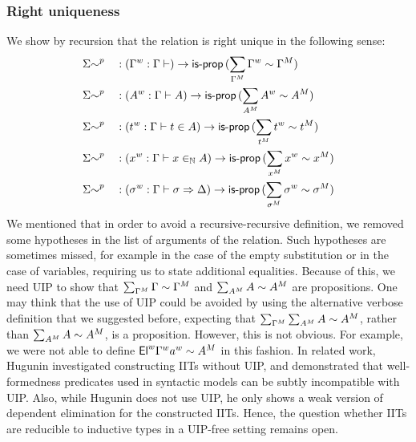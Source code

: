   \subsubsection{Right uniqueness}
  \label{sec:right_uniqueness}
  We show by recursion that the relation is right unique in the following sense:
  \begin{alignat*}{5}
    &
    {\Sigma{\sim}}^p
    && : ({\Gamma}^w : \Gamma \vdash ) \rightarrow
    \mathsf{is\text{-}prop}\, (\sum_{{\Gamma}^M} {\Gamma}^w \sim {\Gamma}^M)
    \\
    &
    {\Sigma{\sim}}^p
    && : ({A}^w : \Gamma \vdash A) \rightarrow
    \mathsf{is\text{-}prop}\, (\sum_{{A}^M} {A}^w \sim {A}^M)
    \\
    &
    {\Sigma{\sim}}^p
    && : ({t}^w : \Gamma \vdash t \in A) \rightarrow
    \mathsf{is\text{-}prop}\, (\sum_{{t}^M} {t}^w \sim {t}^M)
    \\
    &
    {\Sigma{\sim}}^p
    && : ({x}^w : \Gamma \vdash x \in_{\mathbb{N}} A) \rightarrow
    \mathsf{is\text{-}prop}\, (\sum_{{x}^M} {x}^w \sim {x}^M)
    \\
    &
    {\Sigma{\sim}}^p
    && : ({\sigma}^w : \Gamma \vdash \sigma \Rightarrow \Delta) \rightarrow
    \mathsf{is\text{-}prop}\, (\sum_{{\sigma}^M} {\sigma}^w \sim {\sigma}^M)
  \end{alignat*}
  We mentioned that in order to avoid a recursive-recursive definition, we
  removed some hypotheses in the list of arguments of the relation. Such
  hypotheses are sometimes missed, for example in the case of the empty
  substitution or in the case of variables, requiring us to state additional
  equalities. Because of this, we need UIP to show that
  $\sum_{{\Gamma}^M}\Gamma\sim{\Gamma}^M$ and
  $\sum_{{A}^M}A\sim{A}^M$ are propositions.  One may think that the use
  of UIP could be avoided by using the alternative verbose definition that we
  suggested before, expecting that
  $\sum_{{\Gamma}^M}\sum_{{A}^M}A\sim{A}^M$, rather than
  $\sum_{{A}^M}A\sim{A}^M$, is a proposition.  However, this is not
  obvious. For example, we were not able to define
  ${\mathsf{El}}^w{\Gamma}^w{a}^w\sim {A}^M$ in this fashion. In related work,
  Hugunin investigated constructing IITs without
  UIP\cite{hugunin2019constructing}, and demonstrated that well-formedness
  predicates used in syntactic models can be subtly incompatible with UIP. Also,
  while Hugunin does not use UIP, he only shows a weak version of dependent
  elimination for the constructed IITs. Hence, the question whether IITs are
  reducible to inductive types in a UIP-free setting remains open.




